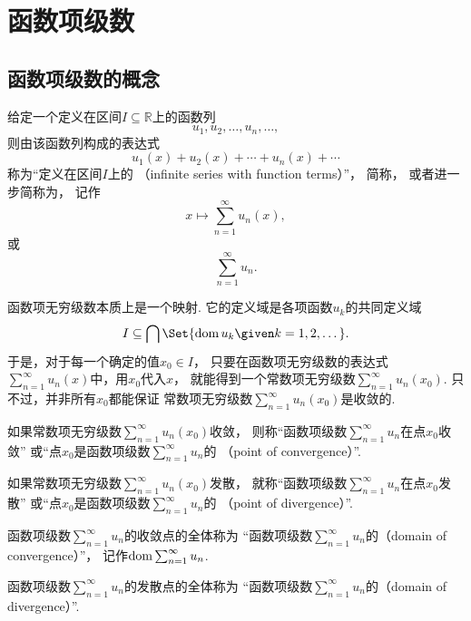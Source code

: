 \section{函数项级数}
\subsection{函数项级数的概念}
\begin{definition}\label{definition:无穷级数.实函数项级数的概念}
给定一个定义在区间\(I \subseteq \mathbb{R}\)上的函数列\[
	u_1,u_2,\dotsc,u_n,\dotsc,
\]
则由该函数列构成的表达式\[
	u_1(x)+u_2(x)+\dotsb+u_n(x)+\dotsb
\]
称为“定义在区间\(I\)上的
（infinite series with function terms）”，
简称，
或者进一步简称为，
记作\[
	x \mapsto \sum_{n=1}^\infty u_n(x),
\]
或\[
	\sum_{n=1}^\infty u_n.
\]
\end{definition}
\begin{remark}
函数项无穷级数本质上是一个映射.
它的定义域是各项函数\(u_k\)的共同定义域\[
	I \subseteq \bigcap\Set{ \dom u_k \given k=1,2,\dotsc }.
\]
于是，对于每一个确定的值\(x_0 \in I\)，
只要在函数项无穷级数的表达式\(\sum_{n=1}^\infty u_n(x)\)中，用\(x_0\)代入\(x\)，
就能得到一个常数项无穷级数\(\sum_{n=1}^\infty u_n(x_0)\).
只不过，并非所有\(x_0\)都能保证
常数项无穷级数\(\sum_{n=1}^\infty u_n(x_0)\)是收敛的.
\end{remark}

\begin{definition}
如果常数项无穷级数\(\sum_{n=1}^\infty u_n(x_0)\)收敛，
则称“函数项级数\(\sum_{n=1}^\infty u_n\)在点\(x_0\)收敛”
或“点\(x_0\)是函数项级数\(\sum_{n=1}^\infty u_n\)的
（point of convergence）”.

如果常数项无穷级数\(\sum_{n=1}^\infty u_n(x_0)\)发散，
就称“函数项级数\(\sum_{n=1}^\infty u_n\)在点\(x_0\)发散”
或“点\(x_0\)是函数项级数\(\sum_{n=1}^\infty u_n\)的
（point of divergence）”.

函数项级数\(\sum_{n=1}^\infty u_n\)的收敛点的全体称为
“函数项级数\(\sum_{n=1}^\infty u_n\)的（domain of convergence）”，
记作\(\operatorname{dom} \sum_{n=1}^\infty u_n\).

函数项级数\(\sum_{n=1}^\infty u_n\)的发散点的全体称为
“函数项级数\(\sum_{n=1}^\infty u_n\)的（domain of divergence）”.
\end{definition}

